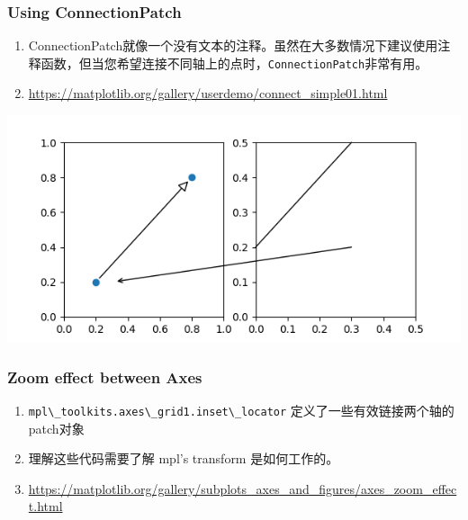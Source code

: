 \documentclass[UTF8,a4paper,12pt]{ctexart}  %
\newcommand{\passthrough}[1]{\lstset{mathescape=false}#1\lstset{mathescape=true}}
\begin{document}
\hypertarget{using-connectionpatch}{%
\subsubsection{Using ConnectionPatch}\label{using-connectionpatch}}

\begin{enumerate}
\def\labelenumi{\arabic{enumi}.}
\item
  ConnectionPatch就像一个没有文本的注释。虽然在大多数情况下建议使用注释函数，但当您希望连接不同轴上的点时，\passthrough{\lstinline!ConnectionPatch!}非常有用。
\item
  \url{https://matplotlib.org/gallery/userdemo/connect_simple01.html}
\end{enumerate}

\includegraphics{images/connect_simple.png}

\hypertarget{zoom-effect-between-axes}{%
\subsubsection{Zoom effect between Axes}\label{zoom-effect-between-axes}}

\begin{enumerate}
\def\labelenumi{\arabic{enumi}.}
\item
  \passthrough{\lstinline!mpl\_toolkits.axes\_grid1.inset\_locator!} 定义了一些有效链接两个轴的patch对象
\item
  理解这些代码需要了解 mpl's transform 是如何工作的。
\item
  \url{https://matplotlib.org/gallery/subplots_axes_and_figures/axes_zoom_effect.html}
\end{enumerate}
\end{document}
